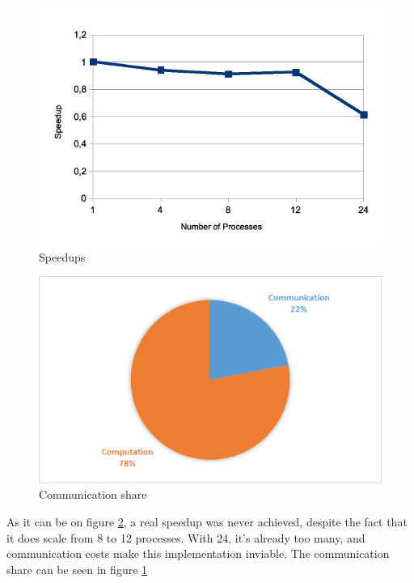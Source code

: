 \documentclass[a4paper,10pt,openright,openbib,twocolumn]{article}
\begin{document}
\begin{figure}[!htb]
    \centering
    \begin{minipage}[t]{\columnwidth}
        \includegraphics[width=\textwidth]{../../../mpi/slides/images/speedup.png}
        \caption{Speedups\label{fig:speedmpi}}
    \end{minipage}
\end{figure}

\begin{figure}[!htb]
    \centering
    \begin{minipage}[t]{\columnwidth}
        \includegraphics[width=\textwidth]{../../../mpi/slides/images/com.png}
        \caption{Communication share \label{fig:com}}
    \end{minipage}
\end{figure}

As it can be on figure \ref{fig:com}, a real speedup was never achieved, despite the fact that it does scale from 8 to 12 processes. With 24, it's already too many, and communication costs make this implementation inviable. The communication share can be seen in figure \ref{fig:speedmpi}
\end{document}
